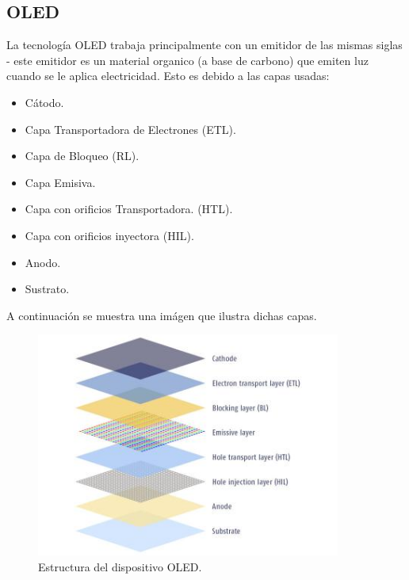 \documentclass[letterpaper, 12pt]{article}
\begin{document}
    \subsection{OLED}
    \justify
    La tecnología OLED trabaja principalmente con un emitidor de las mismas siglas - este emitidor es un material organico (a base de carbono) que emiten luz cuando se le aplica electricidad. Esto es debido a las capas usadas:
    \begin{itemize}
        \item Cátodo.
        \item Capa Transportadora de Electrones (ETL).
        \item Capa de Bloqueo (RL).
        \item Capa Emisiva.
        \item Capa con orificios Transportadora. (HTL).
        \item Capa con orificios inyectora (HIL).
        \item Anodo.
        \item Sustrato.
    \end{itemize}
    A continuación se muestra una imágen que ilustra dichas capas.
    \begin{figure}[H]
        \centering
        \includegraphics[width=10cm]{OLED.jpg}
        \caption{Estructura del dispositivo OLED.}
    \end{figure}
\end{document}
